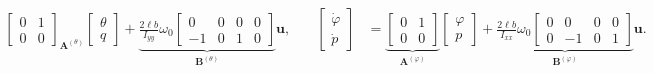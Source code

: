 \begin{align}
{\begin{bmatrix}
    0 & 1 \\
    0 & 0
\end{bmatrix}}_{\mathbf{A}^{(\theta)}}
\begin{bmatrix}
    \theta \\
    q
\end{bmatrix} 
+ \underbrace{
\frac{2\ell b}{I_{yy}}\omega_0 
\begin{bmatrix}
    0 & 0 & 0 & 0 \\
    -1& 0 & 1 & 0
\end{bmatrix}
}_{\mathbf{B}^{(\theta)}} \mathbf{u}, \quad
&\begin{bmatrix}
    \dot{\varphi} \\
    \dot{p}
\end{bmatrix} &= 
\underbrace{\begin{bmatrix}
    0 & 1 \\
    0 & 0 
\end{bmatrix}}_{\mathbf{A}^{(\varphi)}}
\begin{bmatrix}
    \varphi \\
    p 
\end{bmatrix} +
\underbrace{\frac{2\ell b}{I_{xx}}\omega_0 
\begin{bmatrix}
    0 & 0 & 0 & 0 \\
    0 & -1 &0 & 1
\end{bmatrix}}_{\mathbf{B}^{(\varphi)}} \mathbf{u}.
\end{align}

